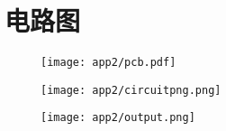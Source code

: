 
\chapter{电路图}
\label{app:circuit}
\begin{figure}[!bhb]
  \centering
  \texttt{[image: app2/pcb.pdf]}
\end{figure}
\label{app:circuit}
\begin{figure}[!bhtb]
  \centering
  \texttt{[image: app2/circuitpng.png]}
\end{figure}
\begin{figure}[!bhtb]
  \centering
  \texttt{[image: app2/output.png]}
\end{figure}


